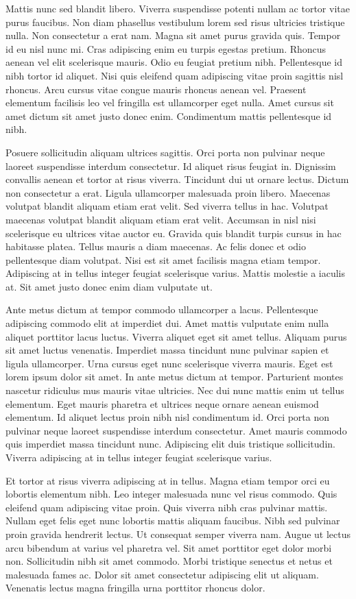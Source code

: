 \documentclass[11pt,a4paper]{article}
\begin{document}
Mattis nunc sed blandit libero. Viverra suspendisse potenti nullam ac tortor vitae purus faucibus. Non diam phasellus vestibulum lorem sed risus ultricies tristique nulla. Non consectetur a erat nam. Magna sit amet purus gravida quis. Tempor id eu nisl nunc mi. Cras adipiscing enim eu turpis egestas pretium. Rhoncus aenean vel elit scelerisque mauris. Odio eu feugiat pretium nibh. Pellentesque id nibh tortor id aliquet. Nisi quis eleifend quam adipiscing vitae proin sagittis nisl rhoncus. Arcu cursus vitae congue mauris rhoncus aenean vel. Praesent elementum facilisis leo vel fringilla est ullamcorper eget nulla. Amet cursus sit amet dictum sit amet justo donec enim. Condimentum mattis pellentesque id nibh.

Posuere sollicitudin aliquam ultrices sagittis. Orci porta non pulvinar neque laoreet suspendisse interdum consectetur. Id aliquet risus feugiat in. Dignissim convallis aenean et tortor at risus viverra. Tincidunt dui ut ornare lectus. Dictum non consectetur a erat. Ligula ullamcorper malesuada proin libero. Maecenas volutpat blandit aliquam etiam erat velit. Sed viverra tellus in hac. Volutpat maecenas volutpat blandit aliquam etiam erat velit. Accumsan in nisl nisi scelerisque eu ultrices vitae auctor eu. Gravida quis blandit turpis cursus in hac habitasse platea. Tellus mauris a diam maecenas. Ac felis donec et odio pellentesque diam volutpat. Nisi est sit amet facilisis magna etiam tempor. Adipiscing at in tellus integer feugiat scelerisque varius. Mattis molestie a iaculis at. Sit amet justo donec enim diam vulputate ut.

Ante metus dictum at tempor commodo ullamcorper a lacus. Pellentesque adipiscing commodo elit at imperdiet dui. Amet mattis vulputate enim nulla aliquet porttitor lacus luctus. Viverra aliquet eget sit amet tellus. Aliquam purus sit amet luctus venenatis. Imperdiet massa tincidunt nunc pulvinar sapien et ligula ullamcorper. Urna cursus eget nunc scelerisque viverra mauris. Eget est lorem ipsum dolor sit amet. In ante metus dictum at tempor. Parturient montes nascetur ridiculus mus mauris vitae ultricies. Nec dui nunc mattis enim ut tellus elementum. Eget mauris pharetra et ultrices neque ornare aenean euismod elementum. Id aliquet lectus proin nibh nisl condimentum id. Orci porta non pulvinar neque laoreet suspendisse interdum consectetur. Amet mauris commodo quis imperdiet massa tincidunt nunc. Adipiscing elit duis tristique sollicitudin. Viverra adipiscing at in tellus integer feugiat scelerisque varius.

Et tortor at risus viverra adipiscing at in tellus. Magna etiam tempor orci eu lobortis elementum nibh. Leo integer malesuada nunc vel risus commodo. Quis eleifend quam adipiscing vitae proin. Quis viverra nibh cras pulvinar mattis. Nullam eget felis eget nunc lobortis mattis aliquam faucibus. Nibh sed pulvinar proin gravida hendrerit lectus. Ut consequat semper viverra nam. Augue ut lectus arcu bibendum at varius vel pharetra vel. Sit amet porttitor eget dolor morbi non. Sollicitudin nibh sit amet commodo. Morbi tristique senectus et netus et malesuada fames ac. Dolor sit amet consectetur adipiscing elit ut aliquam. Venenatis lectus magna fringilla urna porttitor rhoncus dolor.
\end{document}
